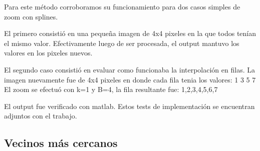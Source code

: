 \documentclass{article}
\begin{document}
Para este método corroboramos su funcionamiento para dos casos simples de zoom con splines.

El primero consistió en una pequeña imagen de 4x4 pixeles en la que todos tenían el mismo valor. Efectivamente luego de ser procesada, el output mantuvo los valores en los pixeles nuevos.

El segundo caso consistió  en evaluar como funcionaba la interpolación en filas. La imagen nuevamente fue de 4x4 pixeles en donde cada fila tenia los valores: 1 3 5 7
El zoom se efectuó con k=1 y B=4, la fila resultante fue: 1,2,3,4,5,6,7

El output fue verificado con matlab. Estos tests de implementación se encuentran adjuntos con el trabajo.

\subsection{Vecinos más cercanos}
\end{document}
